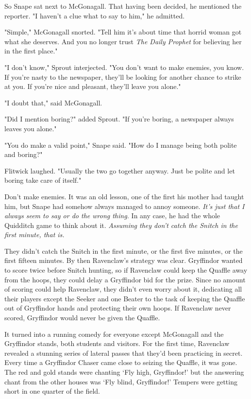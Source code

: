 \documentclass[a4paper,11pt]{article}
\begin{document}
So Snape sat next to McGonagall. That having been decided, he mentioned the reporter. "I haven't a clue what to say to him," he admitted.

"Simple," McGonagall snorted. "Tell him it's about time that horrid woman got what she deserves. And you no longer trust \emph{The Daily Prophet} for believing her in the first place."

"I don't know," Sprout interjected. "You don't want to make enemies, you know. If you're nasty to the newspaper, they'll be looking for another chance to strike at you. If you're nice and pleasant, they'll leave you alone."

"I doubt that," said McGonagall.

"Did I mention boring?" added Sprout. "If you're boring, a newspaper always leaves you alone."

"You do make a valid point," Snape said. "How do I manage being both polite and boring?"

Flitwick laughed. "Usually the two go together anyway. Just be polite and let boring take care of itself."

Don't make enemies. It was an old lesson, one of the first his mother had taught him, but Snape had somehow always managed to annoy someone. \emph{It's just that I always seem to say or do the wrong thing.} In any case, he had the whole Quidditch game to think about it. \emph{Assuming they don't catch the Snitch in the first minute, that is.}

They didn't catch the Snitch in the first minute, or the first five minutes, or the first fifteen minutes. By then Ravenclaw's strategy was clear. Gryffindor wanted to score twice before Snitch hunting, so if Ravenclaw could keep the Quaffle away from the hoops, they could delay a Gryffindor bid for the prize. Since no amount of scoring could help Ravenclaw, they didn't even worry about it, dedicating all their players except the Seeker and one Beater to the task of keeping the Quaffle out of Gryffindor hands and protecting their own hoops. If Ravenclaw never scored, Gryffindor would never be given the Quaffle.

It turned into a running comedy for everyone except McGonagall and the Gryffindor stands, both students and visitors. For the first time, Ravenclaw revealed a stunning series of lateral passes that they'd been practicing in secret. Every time a Gryffindor Chaser came close to seizing the Quaffle, it was gone. The red and gold stands were chanting `Fly high, Gryffindor!' but the answering chant from the other houses was `Fly blind, Gryffindor!' Tempers were getting short in one quarter of the field.
\end{document}
